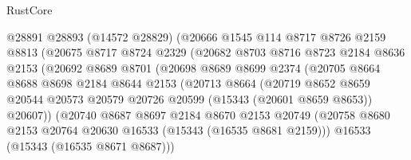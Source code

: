 \begin{lexlean}{RustCore}
\begin{coremodule}
                        @28891
                        @28893
                        (@14572 @28829)
                        (@20666
                          @1545
                          @114
                          @8717
                          @8726
                          @2159
                          @8813
                          (@20675
                            @8717
                            @8724
                            @2329
                            (@20682
                              @8703
                              @8716
                              @8723
                              @2184
                              @8636
                              @2153
                              (@20692
                                @8689
                                @8701
                                (@20698
                                  @8689
                                  @8699
                                  @2374
                                  (@20705
                                    @8664
                                    @8688
                                    @8698
                                    @2184
                                    @8644
                                    @2153
                                    (@20713
                                      @8664
                                      (@20719
                                        @8652
                                        @8659
                                        @20544
                                        @20573
                                        @20579
                                        @20726
                                        @20599
                                        (@15343 (@20601 @8659 @8653))
                                        @20607))
                                    (@20740
                                      @8687
                                      @8697
                                      @2184
                                      @8670
                                      @2153
                                      @20749
                                      (@20758
                                        @8680
                                        @2153
                                        @20764
                                        @20630
                                        @16533
                                        (@15343 (@16535 @8681 @2159)))
                                      @16533
                                      (@15343 (@16535 @8671 @8687)))

\end{coremodule}
\end{lexlean}
